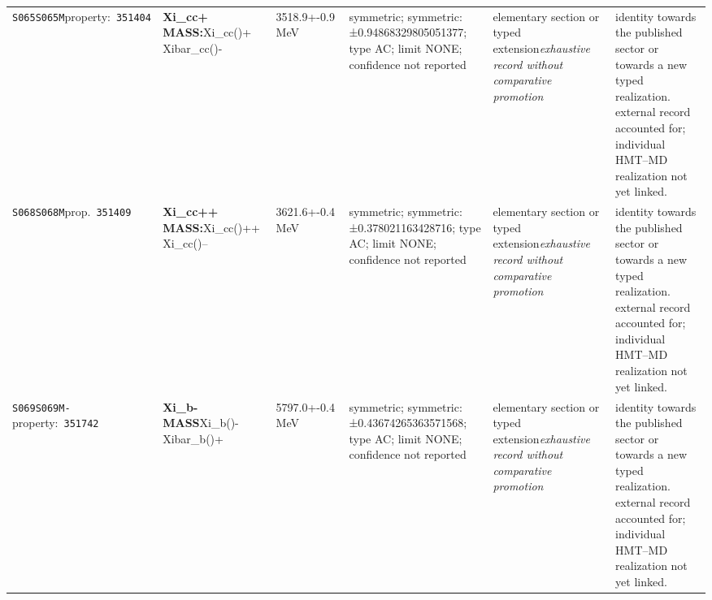 \begin{landscape}
\begin{longtable}{L{1.85cm}L{4.45cm}L{2.35cm}L{4.05cm}L{3.35cm}L{7.15cm}}
\texttt{S065}\newline \texttt{S065M}\newline property:\ \texttt{351404} & \textbf{Xi\_\allowbreak{}cc+ MASS:}\newline Xi\_\allowbreak{}cc()+ \textbar{}\allowbreak{} Xibar\_\allowbreak{}cc()- & 3518.9+-0.9\,MeV & symmetric; symmetric: ±0.94868329805051377; type AC; limit NONE; confidence not reported & elementary section or typed extension\newline \emph{exhaustive record without comparative promotion} & identity towards the published sector or towards a new typed realization. external record accounted for; individual HMT--MD realization not yet linked. \\
\texttt{S068}\newline \texttt{S068M}\newline prop.\ \texttt{351409} & \textbf{Xi\_\allowbreak{}cc++ MASS:}\newline Xi\_\allowbreak{}cc()++ \textbar{}\allowbreak{} Xi\_\allowbreak{}cc()-- & 3621.6+-0.4\,MeV & symmetric; symmetric: ±0.378021163428716; type AC; limit NONE; confidence not reported & elementary section or typed extension\newline \emph{exhaustive record without comparative promotion} & identity towards the published sector or towards a new typed realization. external record accounted for; individual HMT--MD realization not yet linked. \\
\texttt{S069}\newline \texttt{S069M-}\newline property:\ \texttt{351742} & \textbf{Xi\_\allowbreak{}b- MASS}\newline Xi\_\allowbreak{}b()- \textbar{}\allowbreak{} Xibar\_\allowbreak{}b()+ & 5797.0+-0.4\,MeV & symmetric; symmetric: ±0.43674265363571568; type AC; limit NONE; confidence not reported & elementary section or typed extension\newline \emph{exhaustive record without comparative promotion} & identity towards the published sector or towards a new typed realization. external record accounted for; individual HMT--MD realization not yet linked. \\

\end{longtable}
\end{landscape}
